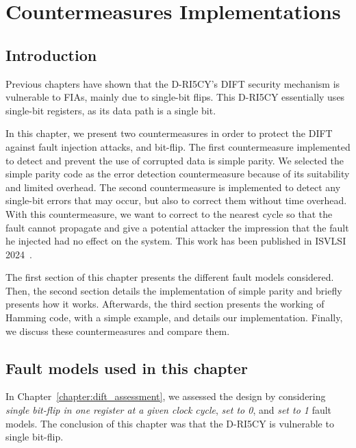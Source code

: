 \chapter{Countermeasures Implementations}
\label{chapter:countermeasures}
\minitoc

\section{Introduction}
Previous chapters have shown that the D-RI5CY's DIFT security mechanism is vulnerable to FIAs, mainly due to single-bit flips. This D-RI5CY essentially uses single-bit registers, as its data path is a single bit.

In this chapter, we present two countermeasures in order to protect the DIFT against fault injection attacks, and bit-flip.
The first countermeasure implemented to detect and prevent the use of corrupted data is simple parity. We selected the simple parity code as the error detection countermeasure because of its suitability and limited overhead.
The second countermeasure is implemented to detect any single-bit errors that may occur, but also to correct them without time overhead. With this countermeasure, we want to correct to the nearest cycle so that the fault cannot propagate and give a potential attacker the impression that the fault he injected had no effect on the system.
This work has been published in ISVLSI 2024~\cite{PRLG-24-isvlsi}.

The first section of this chapter presents the different fault models considered. Then, the second section details the implementation of simple parity and briefly presents how it works. Afterwards, the third section presents the working of Hamming code, with a simple example, and details our implementation. Finally, we discuss these countermeasures and compare them.

\section{Fault models used in this chapter}
In Chapter~\ref{chapter:dift_assessment}, we assessed the design by considering \textit{single bit-flip in one register at a given clock cycle}, \textit{set to 0}, and \textit{set to 1} fault models. The conclusion of this chapter was that the D-RI5CY is vulnerable to single bit-flip.

